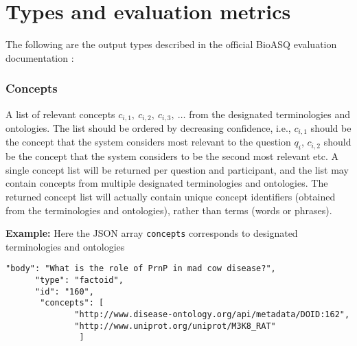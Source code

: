 \section{Types and evaluation metrics}
The following  are the output types described in the official BioASQ evaluation documentation \cite{145}:
\subsubsection{Concepts}
\begin{displayquote}
A list of relevant concepts $c_{i,1},\ c_{i,2},\ c_{i,3},\ \dots$ from the designated terminologies and ontologies. The list should be ordered by decreasing confidence, i.e., $c_{i,1}$ should be the concept that the system considers most relevant to the question $q_i$, $c_{i,2}$ should be the concept that the system considers to be the second most relevant etc. A single concept list will be returned per question and participant, and the list may contain concepts from multiple designated terminologies and ontologies. The returned concept list will actually contain unique concept identifiers (obtained from the terminologies and ontologies), rather than terms (words or phrases).
\end{displayquote}
\textbf{Example:} Here the JSON array \verb|concepts| corresponds to designated terminologies and ontologies 
\small
\begin{verbatim}
"body": "What is the role of PrnP in mad cow disease?", 
      "type": "factoid", 
      "id": "160", 
       "concepts": [
              "http://www.disease-ontology.org/api/metadata/DOID:162", 
              "http://www.uniprot.org/uniprot/M3K8_RAT"         
               ] 
     \end{verbatim}
\normalsize
